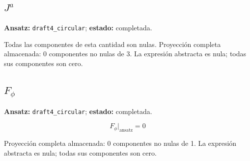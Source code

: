 \documentclass[11pt]{article}
\begin{document}
\subsection*{$ J^a $}
\textbf{Ansatz:} \texttt{draft4\_circular}; \textbf{estado:} completada.\par
Todas las componentes de esta cantidad son nulas.
Proyección completa almacenada: 0 componentes no nulas de 3. La expresión abstracta es nula; todas sus componentes son cero.\par\medskip
{}
\subsection*{$ F_{\phi} $}
\textbf{Ansatz:} \texttt{draft4\_circular}; \textbf{estado:} completada.\par
\begin{dmath*}[breakdepth={5}]
F_{\phi}\big|_{\mathrm{ansatz}} = 0
\end{dmath*}
\par\smallskip
Proyección completa almacenada: 0 componentes no nulas de 1. La expresión abstracta es nula; todas sus componentes son cero.\par\medskip
{}
\end{document}
